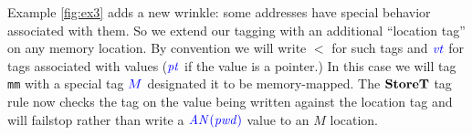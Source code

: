 \documentclass{llncs}
\begin{document}

Example \ref{fig:ex3} adds a new wrinkle: some addresses have special behavior associated with them.
So we extend our tagging with an additional ``location tag'' on any memory location. By convention
we will write \(\lt\) for such tags and \(\mathit{\color{blue} vt}\) for tags associated with values (\(\mathit{\color{blue} pt}\) if the value
is a pointer.) In this case we will tag {\tt mm} with a special tag \({\color{blue} M}\) designated it to be
memory-mapped. The \(\mathbf{StoreT}\) tag rule now checks the tag on the value being written against
the location tag and will failstop rather than write a \(\mathit{\color{blue} \mathit{AN(pwd)}}\) value to an \(M\) location.
\end{document}
